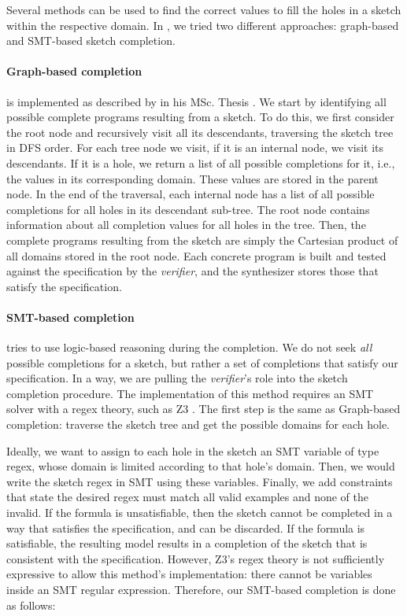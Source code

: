 Several methods can be used to find the correct values to fill the holes in a sketch within the respective domain. In \Forest{}, we tried two different approaches: graph-based and \ac{SMT}-based sketch completion.


\paragraph{Graph-based completion} is implemented as described by \citeauthor{DanielThesis} in his MSc. Thesis \cite{DanielThesis}. We start by identifying all possible complete programs resulting from a sketch. To do this, we first consider the root node and recursively visit all its descendants, traversing the sketch tree in \ac{DFS} order. For each tree node we visit, if it is an internal node, we visit its descendants. If it is a hole, we return a list of all possible completions for it, i.e., the values in its corresponding domain. These values are stored in the parent node. In the end of the traversal, each internal node has a list of all possible completions for all holes in its descendant sub-tree. The root node contains information about all completion values for all holes in the tree. Then, the complete programs resulting from the sketch are simply the Cartesian product of all domains stored in the root node. Each concrete program is built and tested against the specification by the \textit{verifier}, and the synthesizer stores those that satisfy the specification.

\paragraph{SMT-based completion} tries to use logic-based reasoning during the completion.
We do not seek \textit{all} possible completions for a sketch, but rather a set of completions that satisfy our specification.
In a way, we are pulling the \textit{verifier}'s role into the sketch completion procedure.
The implementation of this method requires an \ac{SMT} solver with a regex theory, such as Z3 \cite{z3,z3str317}.
The first step is the same as Graph-based completion: traverse the sketch tree and get the possible domains for each hole.

Ideally, we want to assign to each hole in the sketch an SMT variable of type regex, whose domain is limited according to that hole's domain. Then, we would write the sketch regex in SMT using these variables. Finally, we add constraints that state the desired regex must match all valid examples and none of the invalid. If the formula is unsatisfiable, then the sketch cannot be completed in a way that satisfies the specification, and can be discarded. If the formula is satisfiable, the resulting model results in a completion of the sketch that is consistent with the specification.
However, Z3's regex theory is not sufficiently expressive to allow this method's implementation: there cannot be variables inside an SMT regular expression. Therefore, our SMT-based completion is done as follows:

